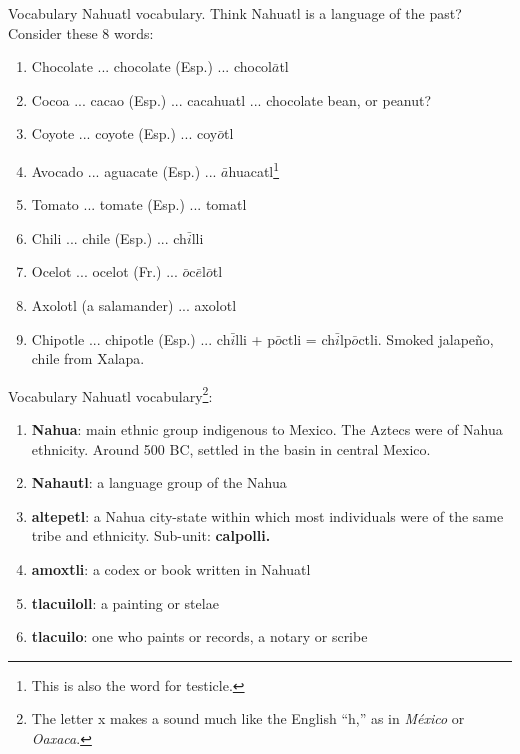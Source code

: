 \documentclass{beamer}
\begin{document}
\begin{frame}{Vocabulary}
\small
Nahuatl vocabulary.  Think Nahuatl is a language of the past?  Consider these 8 words:
\begin{enumerate}
\item Chocolate ... chocolate (Esp.) ... chocol$\bar{a}$tl
\item Cocoa ... cacao (Esp.) ... cacahuatl ... chocolate bean, or peanut?
\item Coyote ... coyote (Esp.) ... coy$\bar{o}$tl
\item Avocado ... aguacate (Esp.) ... $\bar{a}$huacatl\footnote{This is also the word for testicle.}
\item Tomato ... tomate (Esp.) ... tomatl
\item Chili ... chile (Esp.) ... ch$\bar{i}$lli
\item Ocelot ... ocelot (Fr.) ... $\bar{o}$c$\bar{e}$l$\bar{o}$tl
\item Axolotl (a salamander) ... axolotl
\item Chipotle ... chipotle (Esp.) ... ch$\bar{i}$lli + p$\bar{o}$ctli = ch$\bar{i}$lp$\bar{o}$ctli.  Smoked jalape\~{n}o, chile from Xalapa.
\end{enumerate}
\end{frame}

\begin{frame}{Vocabulary}
\small
Nahuatl vocabulary\footnote{The letter x makes a sound much like the English ``h,'' as in \textit{M\'{e}xico} or \textit{Oaxaca}.}:
\begin{enumerate}
\item \textbf{Nahua}: main ethnic group indigenous to Mexico.  The Aztecs were of Nahua ethnicity.  Around 500 BC, settled in the basin in central Mexico.
\item \textbf{Nahautl}: a language group of the Nahua
\item \textbf{altepetl}: a Nahua city-state within which most individuals were of the same tribe and ethnicity.  Sub-unit: \textbf{calpolli.}
\item \textbf{amoxtli}: a codex or book written in Nahuatl
\item \textbf{tlacuiloll}: a painting or stelae
\item \textbf{tlacuilo}: one who paints or records, a notary or scribe
\end{enumerate}
\end{frame}
\end{document}
